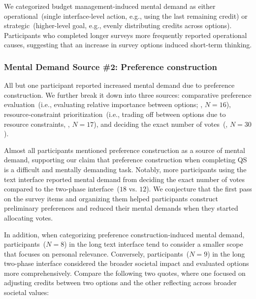 We categorized budget management-induced mental demand as either operational~(single interface-level action, e.g., using the last remaining credit) or strategic~(higher-level goal, e.g., evenly distributing credits across options). Participants who completed longer surveys more frequently reported operational causes, suggesting that an increase in survey options induced short-term thinking.

\subsubsection{Mental Demand Source \#2: Preference construction}
All but one participant reported increased mental demand due to preference construction. We further break it down into three sources: comparative preference evaluation~(i.e., evaluating relative importance between options; , $N=16$), resource-constraint prioritization~(i.e., trading off between options due to resource constraints, , $N=17$), and deciding the exact number of votes~(, $N=30$).

Almost all participants mentioned preference construction as a source of mental demand, supporting our claim that preference construction when completing QS is a difficult and mentally demanding task. Notably, more participants using the text interface reported mental demand from deciding the exact number of votes compared to the two-phase interface~($18$ vs. $12$). We conjecture that the first pass on the survey items and organizing them helped participants construct preliminary preferences and reduced their mental demands when they started allocating votes.

In addition, when categorizing preference construction-induced mental demand, participants~($N=8$) in the long text interface tend to consider a smaller scope that focuses on personal relevance. Conversely, participants~($N=9$) in the long two-phase interface considered the broader societal impact and evaluated options more comprehensively. Compare the following two quotes, where one focused on adjusting credits between two options and the other reflecting across broader societal values:

